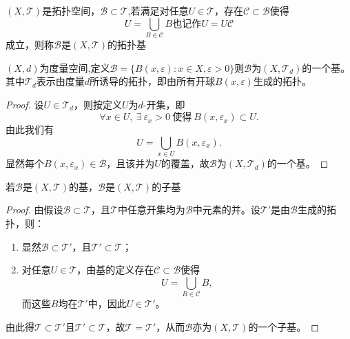 \documentclass[lang=cn,a4paper,newtx,figureplace=section,tableplace=section]{elegantbook}
\begin{document}
\begin{definition}
    $(X,\mathcal T)$是拓扑空间，$\mathcal B\subset \mathcal T$,若满足对任意$U\in\mathcal{T}$，存在$\mathcal{C}\subset\mathcal{B}$使得
\begin{equation}
U = \bigcup_{B \in \mathcal{C}} B\text{也记作}U=U\mathcal{C}
\end{equation}
成立，则称$\mathcal{B}$是$(X,\mathcal{T})$的拓扑基
\end{definition}
\begin{example}
    $(X,d)$为度量空间,定义$\mathcal{B}=\{B(x,\varepsilon):x\in X,\varepsilon>0\}$则$\mathcal{B}$为$(X,\mathcal{T}_d)$的一个基。其中$\mathcal{T}_d$表示由度量$d$所诱导的拓扑，即由所有开球$B(x,\varepsilon)$生成的拓扑。
\end{example}
\begin{proof}
设$U \in \mathcal{T}_d$，则按定义$U$为$d$-开集，即
\[
\forall x \in U, \ \exists \ \varepsilon_x > 0 \ \text{使得} \ B(x,\varepsilon_x) \subset U.
\]
由此我们有
\begin{equation}
U = \bigcup_{x\in U} B(x,\varepsilon_x).
\end{equation}
显然每个$B(x,\varepsilon_x) \in \mathcal{B}$，且该并为$U$的覆盖，故$\mathcal{B}$为$(X,\mathcal{T}_d)$的一个基。
\end{proof}
\begin{proposition}
    若$\mathcal{B}$是$(X,\mathcal{T})$的基，$\mathcal{B}$是$(X,\mathcal{T})$的子基
\end{proposition}
\begin{proof}
由假设$\mathcal{B} \subset \mathcal{T}$，且$\mathcal{T}$中任意开集均为$\mathcal{B}$中元素的并。设$\mathcal{T}'$是由$\mathcal{B}$生成的拓扑，则：
\begin{enumerate}
    \item 显然$\mathcal{B} \subset \mathcal{T}'$，且$\mathcal{T}' \subset \mathcal{T}$；
    \item 对任意$U \in \mathcal{T}$，由基的定义存在$\mathcal{C} \subset \mathcal{B}$使得
    \begin{equation}
        U = \bigcup_{B \in \mathcal{C}} B,
    \end{equation}
    而这些$B$均在$\mathcal{T}'$中，因此$U \in \mathcal{T}'$。
\end{enumerate}
由此得$\mathcal{T} \subset \mathcal{T}'$且$\mathcal{T}' \subset \mathcal{T}$，故$\mathcal{T} = \mathcal{T}'$，从而$\mathcal{B}$亦为$(X,\mathcal{T})$的一个子基。
\end{proof}
\end{document}
